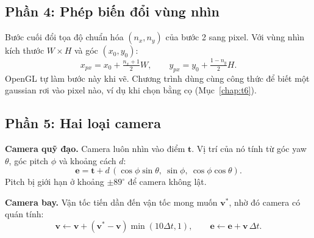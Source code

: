 \documentclass[9pt,twocolumn,a4paper]{extarticle}
\begin{document}
\par\noindent{}\par\vspace{3pt}

\par\noindent{}\par\vspace{3pt}

\subsection{Phần 4: Phép biến đổi vùng nhìn}
\label{sec:viewport}
Bước cuối đổi tọa độ chuẩn hóa $(n_x,n_y)$ của bước 2 sang pixel. Với vùng nhìn kích thước $W\times H$ và góc $(x_0,y_0)$:
\begin{equation}
x_{px}=x_0+\tfrac{n_x+1}{2}W,\qquad y_{px}=y_0+\tfrac{1-n_y}{2}H.
\label{eq:pixel}
\end{equation}
OpenGL tự làm bước này khi vẽ. Chương trình dùng cùng công thức để biết một gaussian rơi vào pixel nào, ví dụ khi chọn bằng cọ (Mục~\ref{chap:t6}).

\par\noindent{}\par\vspace{3pt}

\subsection{Phần 5: Hai loại camera}
\textbf{Camera quỹ đạo.} Camera luôn nhìn vào điểm $\mathbf{t}$. Vị trí của nó tính từ góc yaw $\theta$, góc pitch $\phi$ và khoảng cách $d$:
\begin{equation}
\mathbf{e}=\mathbf{t}+d\,(\cos\phi\sin\theta,\ \sin\phi,\ \cos\phi\cos\theta).
\label{eq:eye}
\end{equation}
Pitch bị giới hạn ở khoảng $\pm89^{\circ}$ để camera không lật.

\par\noindent{}\par\vspace{3pt}

\textbf{Camera bay.} Vận tốc tiến dần đến vận tốc mong muốn $\mathbf{v}^{*}$, nhờ đó camera có quán tính:
\begin{equation}
\mathbf{v}\leftarrow\mathbf{v}+(\mathbf{v}^{*}-\mathbf{v})\min(10\Delta t,1),\qquad
\mathbf{e}\leftarrow\mathbf{e}+\mathbf{v}\,\Delta t.
\label{eq:fly}
\end{equation}
\end{document}
